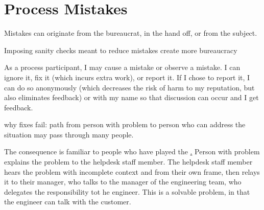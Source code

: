 \section{Process Mistakes}

Mistakes can originate from the bureaucrat, in the hand off, or from the subject.

Imposing sanity checks meant to reduce mistakes create more bureaucracy 


As a process participant, I may cause a mistake or observe a mistake. I can ignore it, fix it (which incurs extra work), or report it. If I chose to report it, I can do so anonymously (which decreases the risk of harm to my reputation, but also eliminates feedback) or with my name so that discussion can occur and I get feedback.
    
    
    
why fixes fail: path from person with problem to person who can address the situation may pass through many people. 

The consequence is familiar to people who have played the \href{game of telephone}.
Person with problem explains the problem to the helpdesk staff member. The helpdesk staff member hears the problem with incomplete context and from their own frame, then relays it to their manager, who talks to the manager of the engineering team, who delegates the responsibility tot he engineer. 
This is a solvable problem, in that the engineer can talk with the customer. 


